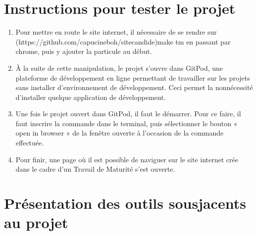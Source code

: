 \documentclass[a4,10pt,french]{sphinxmanual}
\begin{document}
\section{Instructions pour tester le projet}
\label{\detokenize{chapitre-02:instructions-pour-tester-le-projet}}\begin{enumerate}
%
\item {} 
\sphinxAtStartPar
Pour mettre en route le site internet, il nécessaire de se rendre sur  (https://github.com/capucineboh/site\sphinxhyphen{}candide)\sphinxfootnotemark[1]make tm en passant par chrome, puis y ajouter la particule  au début.

\item {} 
\sphinxAtStartPar
À la suite de cette manipulation, le projet s’ouvre dans GitPod, une plateforme de développement en ligne permettant de travailler sur les projets sans installer d’environnement de développement. Ceci permet la non\sphinxhyphen{}nécessité d’installer quelque application de développement.

\item {} 
\sphinxAtStartPar
Une fois le projet ouvert dans GitPod, il faut le démarrer. Pour ce faire, il faut inscrire la commande  dans le terminal, puis sélectionner le bouton « open in browser » de la fenêtre ouverte à l’occasion de la commande effectuée.

\item {} 
\sphinxAtStartPar
Pour finir, une page où il est possible de naviguer sur le site internet crée dans le cadre d’un Travail de Maturité s’est ouverte.

\end{enumerate}


\section{Présentation des outils sous\sphinxhyphen{}jacents au projet}
\label{\detokenize{chapitre-02:presentation-des-outils-sous-jacents-au-projet}}
\end{document}
